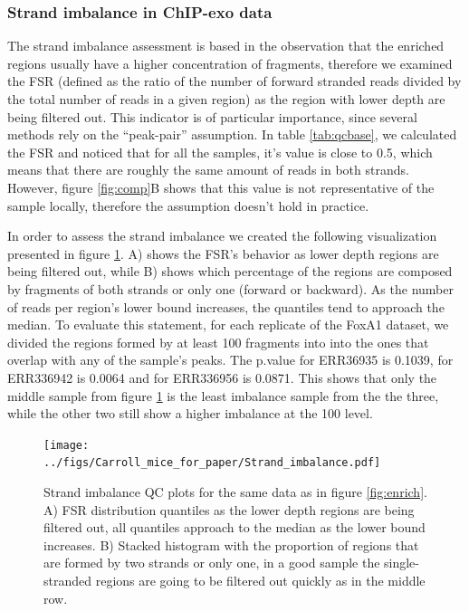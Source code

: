 \documentclass{bmcart}\usepackage[]{graphicx}\usepackage[]{color}
\begin{document}
\subsubsection{Strand imbalance in ChIP-exo data}
\label{sec:strand_imbalance}

The strand imbalance assessment is based in the observation that the
enriched regions usually have a higher concentration of fragments,
therefore we examined the FSR (defined as the ratio of the number of
forward stranded reads divided by the total number of reads in a given
region) as the region with lower depth are being filtered out. This
indicator is of particular importance, since several methods rely on
the ``peak-pair'' assumption. In table \ref{tab:qcbase}, we calculated
the FSR and noticed that for all the samples, it's value is close to
0.5, which means that there are roughly the same amount of reads in
both strands. However, figure \ref{fig:comp}B shows that this value is
not representative of the sample locally, therefore the assumption
doesn't hold in practice.



In order to assess the strand imbalance we created the following
visualization presented in figure \ref{fig:strand}. A) shows the FSR's
behavior as lower depth regions are being filtered out, while B) shows
which percentage of the regions are composed by fragments of both
strands or only one (forward or backward). As the number of reads per
region's lower bound increases, the quantiles tend to approach the
median. To evaluate this statement, for each replicate of the FoxA1
dataset, we divided the regions formed by at least 100
fragments into into the ones that overlap with any of the sample's
peaks. The p.value for ERR36935 is 0.1039, for ERR336942 is
0.0064 and for ERR336956 is 0.0871. This shows
that only the middle sample from figure \ref{fig:strand} is the least
imbalance sample from the the three, while the other two still show a
higher imbalance at the 100 level.

\begin{figure}[h!]
  \centering  
  \texttt{[image: ../figs/Carroll\_mice\_for\_paper/Strand\_imbalance.pdf]} 
  \caption{Strand imbalance QC plots for the same data as in figure
    \ref{fig:enrich}. A) FSR distribution quantiles as the lower depth
    regions are being filtered out, all quantiles approach to the
    median as the lower bound increases. B) Stacked histogram with the
    proportion of regions that are formed by two strands or only one,
    in a good sample the single-stranded regions are going to be
    filtered out quickly as in the middle row.}
  \label{fig:strand}
\end{figure}
\end{document}
